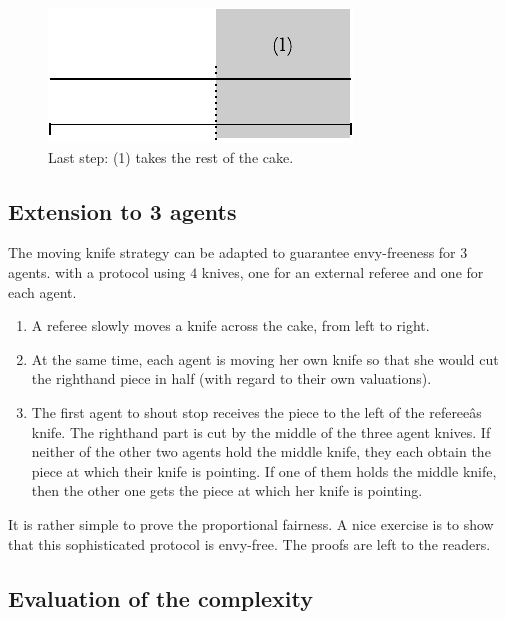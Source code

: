 \begin{figure}[htb]
\begin{center}
        \includegraphics[scale=0.6]{FiguresMaths/CakeEnvyFree4}
        \caption{Last step: (1) takes the rest of the cake.}
        \label{Fig:cakeEnvyFree4}
\end{center}
\end{figure}



\subsection{Extension to 3 agents}

The moving knife strategy can be adapted to guarantee envy-freeness for 3 agents.
with a protocol using $4$ knives, one for an external referee and one for each agent.

\begin{enumerate}
\item
A referee slowly moves a knife across the cake, from left to right.
\item
At the same time, each agent is moving her own knife so that she would cut the righthand piece in half 
(with regard to their own valuations).
\item
The first agent to shout stop receives the piece to the left of the refereeâs knife. 
The righthand part is cut by the middle of the three agent knives. 
If neither of the other two agents hold the middle knife, they each obtain the piece at which their knife is pointing. 
If one of them holds the middle knife, then the other one gets the piece at which her knife is pointing.
\end{enumerate}
\bigskip

It is rather simple to prove the proportional fairness.
A nice exercise is to show that this sophisticated protocol is envy-free. The proofs are left to the readers. 


\subsection{Evaluation of the complexity}

